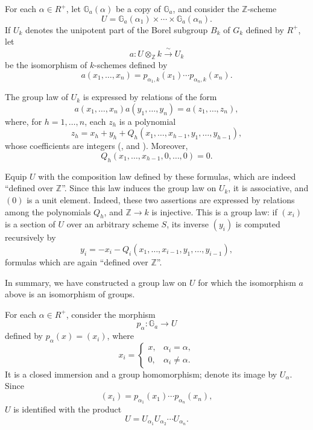 
For each \(\alpha\in R^+\), let \(\mathbb G_a(\alpha)\) be a copy of
\(\mathbb G_a\), and consider the \(\mathbb Z\)-scheme
\[
 U=\mathbb G_a(\alpha_1)\times\cdots\times\mathbb G_a(\alpha_n).
\]
If \(U_k\) denotes the unipotent part of the Borel subgroup \(B_k\) of
\(G_k\) defined by \(R^+\), let
\[
 a\colon U\otimes_{\mathbb Z}k\xrightarrow{\ \sim\ }U_k
\]
be the isomorphism of \(k\)-schemes defined by
\[
 a(x_1,\ldots,x_n)
 =p_{\alpha_1,k}(x_1)\cdots p_{\alpha_n,k}(x_n).
\]


The group law of \(U_k\) is expressed by relations of the form
\[
 a(x_1,\ldots,x_n)a(y_1,\ldots,y_n)=a(z_1,\ldots,z_n),
\]
where, for \(h=1,\ldots,n\), each \(z_h\) is a polynomial
\[
 z_h=x_h+y_h+
 Q_h(x_1,\ldots,x_{h-1},y_1,\ldots,y_{h-1}),
\]
whose coefficients are integers (, and ). Moreover,
\[
 Q_h(x_1,\ldots,x_{h-1},0,\ldots,0)=0.
\]

Equip \(U\) with the composition law defined by these formulas, which are
indeed ``defined over \(\mathbb Z\)''. Since this law induces the group law
on \(U_k\), it is associative, and \((0)\) is a unit element. Indeed, these
two assertions are expressed by relations among the polynomials \(Q_h\),
and \(\mathbb Z\to k\) is injective. This is a group law: if \((x_i)\) is
a section of \(U\) over an arbitrary scheme \(S\), its inverse \((y_i)\)
is computed recursively by
\[
 y_i=-x_i-Q_i(x_1,\ldots,x_{i-1},y_1,\ldots,y_{i-1}),
\]
formulas which are again ``defined over \(\mathbb Z\)''.

In summary, we have constructed a group law on \(U\) for which the
isomorphism \(a\) above is an isomorphism of groups.

For each \(\alpha\in R^+\), consider the morphism
\[
 p_\alpha\colon\mathbb G_a\longrightarrow U
\]
defined by \(p_\alpha(x)=(x_i)\), where
\[
 x_i=
 \begin{cases}
 x,&\alpha_i=\alpha,\\
 0,&\alpha_i\ne\alpha.
 \end{cases}
\]
It is a closed immersion and a group homomorphism; denote its image by
\(U_\alpha\). Since
\[
 (x_i)=p_{\alpha_1}(x_1)\cdots p_{\alpha_n}(x_n),
\]
\(U\) is identified with the product
\[
 U=U_{\alpha_1}U_{\alpha_2}\cdots U_{\alpha_n}.
\]

